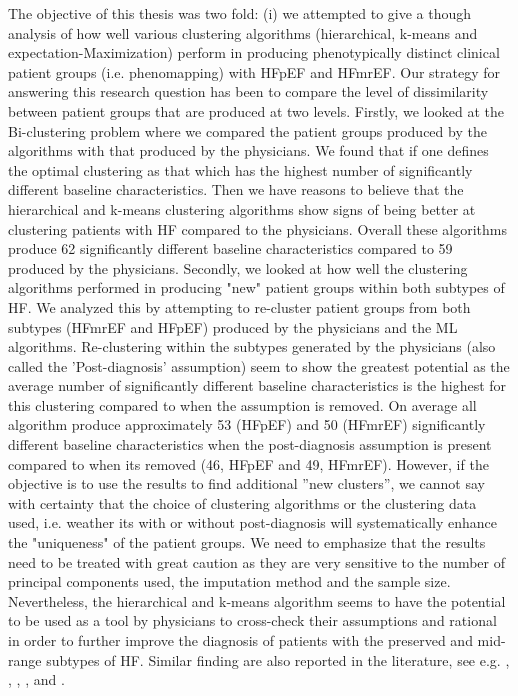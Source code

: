 \documentclass[../thesis.tex]{subfiles}
\begin{document}
\noindent The objective of this thesis was two fold: (i) we attempted to give a though analysis of how well various clustering algorithms (hierarchical, k-means and expectation-Maximization) perform in producing phenotypically distinct clinical patient groups (i.e. phenomapping) with HFpEF and HFmrEF. Our strategy for answering this research question has been to compare the level of dissimilarity between patient groups that are produced at two levels. Firstly, we looked at the Bi-clustering problem where we compared the patient groups produced by the algorithms with that produced by the physicians. We found that if one defines the optimal clustering as that which has the highest number of significantly different baseline characteristics. Then we have reasons to believe that the hierarchical and k-means clustering algorithms show signs of being better at clustering patients with HF compared to the physicians. Overall these algorithms produce 62 significantly different baseline characteristics compared to 59 produced by the physicians. Secondly, we looked at how well the clustering algorithms performed in producing "new" patient groups within both subtypes of HF. We analyzed this by attempting to re-cluster patient groups from both subtypes (HFmrEF and HFpEF) produced by the physicians and the ML algorithms. Re-clustering within the subtypes generated by the physicians (also called the 'Post-diagnosis' assumption) seem to show the greatest potential as the average number of significantly different baseline characteristics is the highest for this clustering compared to when the assumption is removed. On average all algorithm produce approximately 53 (HFpEF) and 50 (HFmrEF) significantly different baseline characteristics when the post-diagnosis assumption is present compared to when its removed (46, HFpEF and 49, HFmrEF). However, if the objective is to use the results to find additional ''new clusters'', we cannot say with certainty that the choice of clustering algorithms or the clustering data used, i.e. weather its with or without post-diagnosis will systematically enhance the "uniqueness" of the patient groups. We need to emphasize that the results need to be treated with great caution as they are very sensitive to the number of principal components used, the imputation method and the sample size. Nevertheless, the hierarchical and k-means algorithm seems to have the potential to be used as a tool by physicians to cross-check their assumptions and rational in order to further improve the diagnosis of patients with the preserved and mid-range subtypes of HF. Similar finding are also reported in the literature, see e.g. \cite{shah2014phenomapping}, \cite{ahmad2014clinical}, \cite{alonso2015exploring}, \cite{kao2015characterization}, \cite{ahmad2016clinical} and \cite{katz2017phenomapping}.\\
\end{document}

